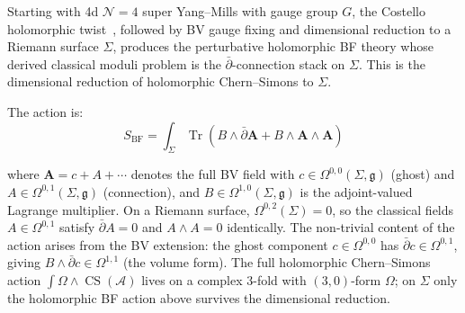 \begin{theorem}[HT theory from 4d \texorpdfstring{$\mathcal{N}=4$}{N=4} SYM;
\ClaimStatusConditional; licensing $\alpha+\gamma$ via the Costello
holomorphic-twist datum, BV gauge fixing, dimensional reduction, and
$\hypKMHTBV$]
\label{thm:ht-from-n4-sym}
Starting with 4d $\mathcal{N}=4$ super Yang--Mills with gauge group
$G$, the Costello holomorphic twist~\cite{costello-gaiotto}, followed
by BV gauge fixing and dimensional reduction to a Riemann surface
\(\Sigma\), produces the perturbative holomorphic BF theory whose
derived classical moduli problem is the \(\bar\partial\)-connection
stack on \(\Sigma\).  This is the dimensional reduction of
holomorphic Chern--Simons to \(\Sigma\).

The action is:
\[S_{\text{BF}} = \int_{\Sigma} \operatorname{Tr}\!\left(B \wedge \bar{\partial} \mathbf{A} + B \wedge \mathbf{A} \wedge \mathbf{A}\right)\]

where $\mathbf{A} = c + A + \cdots$ denotes the full BV field with $c \in \Omega^{0,0}(\Sigma, \mathfrak{g})$ (ghost) and $A \in \Omega^{0,1}(\Sigma, \mathfrak{g})$ (connection), and $B \in \Omega^{1,0}(\Sigma, \mathfrak{g})$ is the adjoint-valued Lagrange multiplier.
On a Riemann surface, $\Omega^{0,2}(\Sigma) = 0$, so the classical fields
$A \in \Omega^{0,1}$ satisfy $\bar{\partial}A = 0$ and $A \wedge A = 0$ identically. The non-trivial
content of the action arises from the BV extension: the ghost component $c \in \Omega^{0,0}$ has
$\bar{\partial}c \in \Omega^{0,1}$, giving $B \wedge \bar{\partial}c \in \Omega^{1,1}$ (the volume form).
The full holomorphic Chern--Simons action $\int \Omega \wedge \operatorname{CS}(\mathcal{A})$ lives on a
complex $3$-fold with $(3,0)$-form $\Omega$; on $\Sigma$ only the holomorphic BF action above survives the dimensional reduction.
\end{theorem}

